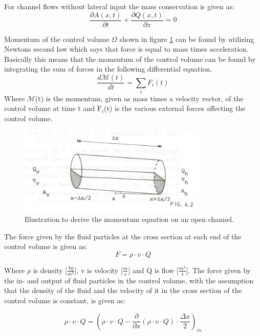 For channel flows without lateral input the mass conservation is given as:
\begin{equation}	
\frac{\partial A(x,t)}{\partial t} + \frac{\partial Q(x,t)}{\partial x}=0
\label{saintbernard_mass}
\end{equation}


Momentum of the control volume $\Omega$ shown in figure \ref{fig:momentum_picture} can be found by utilizing Newtons second law which says that force is equal to mass times acceleration.
Basically this means that the momentum of the control volume can be found by integrating the sum of forces in the following differential equation.
\begin{equation}
	\frac{d \mathcal{M}(t)}{dt} = \sum_{i}F_i(t)
\end{equation} 
Where $\mathcal{M}$(t) is the momentum, given as mass times a velocity vector, of the control volume at time t and $\text{F}_i$(t) is the various external forces affecting the control volume.

\begin{figure}[H]
\centering
\includegraphics[width=0.8\textwidth]{report/modeling/pictures/momentum_picture.png}
\caption{Illustration to derive the momentum equation on an open channel.}
\label{fig:momentum_picture}
\end{figure}


The force given by the fluid particles at the cross section at each end of the control volume is given as:
\begin{equation}
	F= \rho \cdot v \cdot Q 
\end{equation}

Where $\rho$ is density [$\frac{kg}{m^3}$], v is velocity [$\frac{m}{s}$] and Q is flow [$\frac{m^3}{s}$].
The force given by the in- and output of fluid particles in the control volume, with the assumption that the density of the fluid and the velocity of it in the cross section of the control volume is constant, is given as:

\begin{equation}
	\rho \cdot v \cdot Q = \left(\rho \cdot v \cdot Q - \frac{\partial}{\partial x}(\rho \cdot v \cdot Q) \cdot \frac{\Delta x}{2}\right)_{in}
\end{equation}

